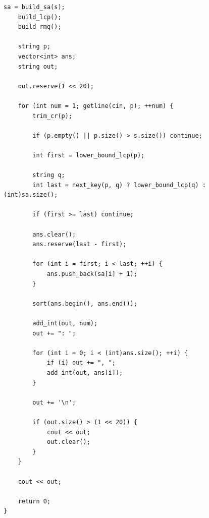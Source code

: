 \begin{lstlisting}[breaklines=true, postbreak=\mbox{\textcolor{red}{$\hookrightarrow$}\space}]
    sa = build_sa(s);
    build_lcp();
    build_rmq();

    string p;
    vector<int> ans;
    string out;

    out.reserve(1 << 20);

    for (int num = 1; getline(cin, p); ++num) {
        trim_cr(p);

        if (p.empty() || p.size() > s.size()) continue;

        int first = lower_bound_lcp(p);

        string q;
        int last = next_key(p, q) ? lower_bound_lcp(q) : (int)sa.size();

        if (first >= last) continue;

        ans.clear();
        ans.reserve(last - first);

        for (int i = first; i < last; ++i) {
            ans.push_back(sa[i] + 1);
        }

        sort(ans.begin(), ans.end());

        add_int(out, num);
        out += ": ";

        for (int i = 0; i < (int)ans.size(); ++i) {
            if (i) out += ", ";
            add_int(out, ans[i]);
        }

        out += '\n';

        if (out.size() > (1 << 20)) {
            cout << out;
            out.clear();
        }
    }

    cout << out;

    return 0;
}
\end{lstlisting}

\pagebreak